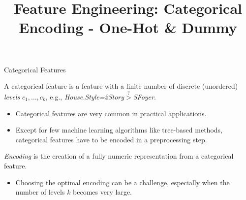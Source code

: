 



\newcommand{\titlefigure}{categorical_encoding_title.png}
\newcommand{\learninggoals}{
  \item Understand why categorical features need special encoding
  \item Learn one-hot and dummy encoding techniques
  \item Recognize limitations of simple encoding methods
  \item Know when to use different encoding strategies
}

\title{Feature Engineering: Categorical Encoding - One-Hot \& Dummy}
\date{}





\sloppy


\begin{vbframe}{Categorical Features}

A categorical feature is a feature with a finite number of discrete (unordered) \textit{levels} $c_1, \dots, c_k$, e.g., \textit{House.Style=2Story}$\stackrel{?}{>}$\textit{SFoyer}.

\begin{itemize}
\item Categorical features are very common in practical applications.

\item Except for few machine learning algorithms like tree-based methods, categorical features have to be encoded in a preprocessing step.
\end{itemize}

\textit{Encoding} is the creation of a fully numeric representation from a categorical feature.

\begin{itemize}
\item Choosing the optimal encoding can be a challenge, especially when the number of levels $k$ becomes very large.
\end{itemize}

\end{vbframe}

